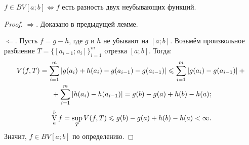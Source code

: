 \begin{theorem}
    $f \in BV[a; b] \Leftrightarrow f$ есть разность двух неубывающих функций.
\end{theorem}

\begin{proof}
    $\Rightarrow$. Доказано в предыдущей лемме.

    $\Leftarrow$. Пусть $f = g - h$, где $g$ и $h$ не убывают на $[a; b]$. Возьмём произвольное разбиение $T = \{[a_{i - 1}; a_i]\}_{i = 1}^m$ отрезка $[a; b]$. Тогда:
    \begin{multline*}
        V(f, T) = \sum_{i = 1}^m\left\lvert g(a_i) + h(a_i) - g(a_{i - 1}) - g(a_{i - 1})\right\rvert \leqslant \sum_{i = 1}^m\left\lvert g(a_i) - g(a_{i - 1})\right\rvert + {}\\{} + \sum_{i = 1}^m\left\lvert h(a_i) - h(a_{i - 1})\right\rvert = g(b) - g(a) + h(b) - h(a);
    \end{multline*}
    \[
        \operatorname*{V}\limits_a^bf = \sup\limits_TV(f, T) \leqslant g(b) - g(a) + h(b) - h(a) < \infty.
    \]
    Значит, $f \in BV[a; b]$ по определению.
\end{proof}

